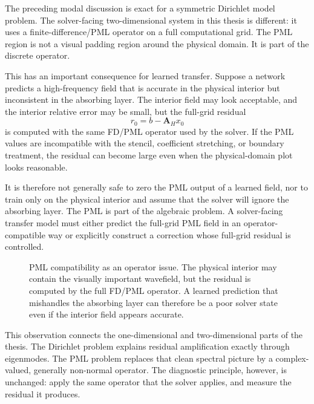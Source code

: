 The preceding modal discussion is exact for a symmetric Dirichlet model
problem. The solver-facing two-dimensional system in this thesis is different:
it uses a finite-difference/PML operator on a full computational grid. The PML
region is not a visual padding region around the physical domain. It is part
of the discrete operator.

This has an important consequence for learned transfer. Suppose a network
predicts a high-frequency field that is accurate in the physical interior but
inconsistent in the absorbing layer. The interior field may look acceptable,
and the interior relative error may be small, but the full-grid residual
\begin{equation}
    r_0
    =
    b-\mathbf{A}_H x_0
    \label{eq:ch5-pml-residual}
\end{equation}
is computed with the same FD/PML operator used by the solver. If the PML
values are incompatible with the stencil, coefficient stretching, or boundary
treatment, the residual can become large even when the physical-domain plot
looks reasonable.

It is therefore not generally safe to zero the PML output of a learned field,
nor to train only on the physical interior and assume that the solver will
ignore the absorbing layer. The PML is part of the algebraic problem. A
solver-facing transfer model must either predict the full-grid PML field in an
operator-compatible way or explicitly construct a correction whose full-grid
residual is controlled.

\begin{figure}[htbp]
    \centering
    \caption{PML compatibility as an operator issue. The physical interior may
    contain the visually important wavefield, but the residual is computed by
    the full FD/PML operator. A learned prediction that mishandles the
    absorbing layer can therefore be a poor solver state even if the interior
    field appears accurate.}
    \label{fig:ch5-pml-operator-compatibility}
\end{figure}

This observation connects the one-dimensional and two-dimensional parts of the
thesis. The Dirichlet problem explains residual amplification exactly through
eigenmodes. The PML problem replaces that clean spectral picture by a
complex-valued, generally non-normal operator. The diagnostic principle,
however, is unchanged: apply the same operator that the solver applies, and
measure the residual it produces.

